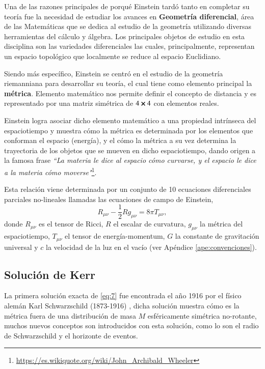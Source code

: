 Una de las razones principales de porqué Einstein tardó tanto en completar su teoría fue la necesidad de estudiar los avances en \textbf{Geometría diferencial}, área de las Matemáticas que se dedica al estudio de la geometría utilizando diversas herramientas del cálculo y álgebra. Los principales objetos de estudio en esta disciplina son las variedades diferenciales las cuales, principalmente, representan un espacio topológico que localmente se reduce al espacio Euclidiano.

Siendo más específico, Einstein se centró en el estudio de la geometría riemanniana para desarrollar su teoría, el cual tiene como elemento principal la \textbf{métrica}. Elemento matemático nos permite definir el concepto de distancia y es representado por una matriz simétrica de $4 \cross 4$ con elementos reales.

Einstein logra asociar dicho elemento matemático a una propiedad intrínseca del espaciotiempo y muestra cómo la métrica es determinada por los elementos que conforman el espacio (energía), y el cómo la métrica a su vez determina la trayectoria de los objetos que se mueven en dicho espaciotiempo, dando origen a la famosa frase \textit{``La materia le dice al espacio cómo curvarse, y el espacio le dice a la materia cómo moverse"}\footnote{\url{https://es.wikiquote.org/wiki/John_Archibald_Wheeler}}.

Esta relación viene determinada por un conjunto de 10 ecuaciones diferenciales parciales no-lineales llamadas las ecuaciones de campo de Einstein,
\begin{equation}
\label{eq:7}
R_{\mu \nu} - \frac{1}{2}R g_{\mu \nu} = 8\pi  T_{\mu \nu},
\end{equation}
donde $R_{\mu \nu}$ es el tensor de Ricci, $R$ el escalar de curvatura, $g_{\mu \nu}$ la métrica del espaciotiempo, $T_{\mu \nu}$ el tensor de energía-momentum, $G$ la constante de gravitación universal y $c$ la velocidad de la luz en el vacío (ver Apéndice \ref{ape:convenciones}).

\subsection{Solución de Kerr}

La primera solución exacta de \eqref{eq:7} fue encontrada el año 1916 por el físico alemán Karl Schwarzschild (1873-1916) \cite{Heinicke}, dicha solución muestra cómo es la métrica fuera de una distribución de masa $M$ esféricamente simétrica no-rotante, muchos nuevos conceptos son introducidos con esta solución, como lo son el radio de Schwarzschild y el horizonte de eventos.

